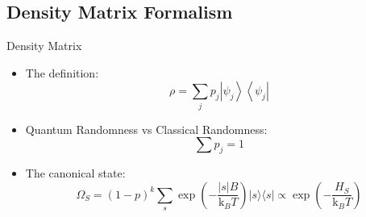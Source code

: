 \documentclass[handout]{beamer}
\begin{document}
\subsection{Density Matrix Formalism}
\begin{frame}{Density Matrix}
\begin{itemize}
\item The definition:
\begin{equation}
\rho=\sum_{j} p_{j}\left|\psi_{j}\right\rangle\left\langle\psi_{j}\right|
\end{equation}
\item Quantum Randomness vs Classical Randomness:
\begin{equation}\sum p_j =1
\end{equation}
\item The canonical state:
\begin{equation}
\Omega_{S}=(1-p)^{k} \sum_{s} \exp \left(-\frac{|s| B}{\mathrm{k}_{B} T}\right)|s\rangle\langle s|
\propto \exp \left(-\frac{H_{S}}{\mathrm{k}_{B} T}\right)
\label{Omega}
\end{equation}
\end{itemize}

\end{frame}
\end{document}
